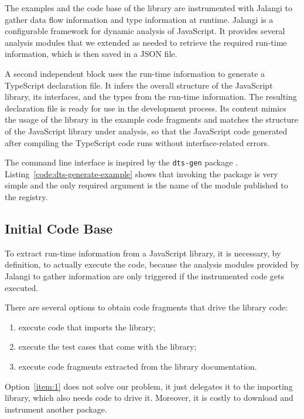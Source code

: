 \documentclass[english,cleveref,autoref,submission]{programming}
\newcommand{\coderef}[1]{Listing~\ref{#1}}
\begin{document}
The examples and the code base of the library are instrumented with
Jalangi \cite{DBLP:conf/sigsoft/SenKBG13} to gather data flow
information and type information at runtime. Jalangi is a configurable
framework for dynamic analysis of JavaScript. It provides several
analysis modules that we extended as needed to retrieve the required
run-time information, which is then saved in a JSON file. 

A second independent block uses the run-time information to generate a
TypeScript declaration file. It infers the overall structure of the JavaScript
library, its interfaces, and the types from the run-time information. 
The resulting declaration file is ready for use in the development
process. Its content mimics the usage of the library in the example
code fragments and matches the structure of the
JavaScript library under analysis, so that the JavaScript code
generated after compiling the TypeScript code runs without
interface-related errors.

The command line interface is inspired by the \texttt{dts-gen} package
\cite{dts-gen}. \coderef{code:dts-generate-example} shows
that invoking the package is very simple and the only required
argument is the name of the module published to the \NPM{} registry. 


\subsection{Initial Code Base}
\label{sec:initial-code-base}

To extract run-time information from a JavaScript library, it is
necessary, by definition, to actually execute the code, because the
analysis modules provided by Jalangi to gather information are only
triggered if the instrumented code gets executed.

There are several options to obtain code fragments that drive the
library code:
\begin{enumerate}
\item\label{item:1} execute code that imports the library;
\item\label{item:2} execute the test cases that come with the library;
\item\label{item:3} execute code fragments extracted from the library documentation.
\end{enumerate}

Option~\ref{item:1} does not solve our problem, it just delegates it
to the importing library, which also needs code to drive it. Moreover,
it is costly to download and instrument another package.
\end{document}
